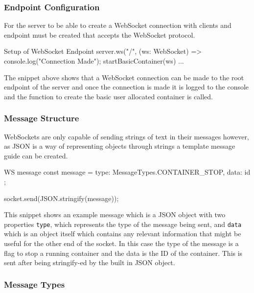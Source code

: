 \subsubsection{Endpoint Configuration} \label{impl-ws-config}

For the server to be able to create a WebSocket connection with clients and endpoint must be created that accepts the WebSocket protocol. 

\begin{sexylisting}{Setup of WebSocket Endpoint}
    server.ws("/", (ws: WebSocket) => {
        console.log("Connection Made");
        startBasicContainer(ws)
        {...}
    }
\end{sexylisting}

The snippet above shows that a WebSocket connection can be made to the root endpoint of the server and once the connection is made it is logged to the console and the function to create the basic user allocated container is called.

\subsubsection{Message Structure} \label{impl-ws-msg-struct}

WebSockets are only capable of sending strings of text in their messages however, as JSON is a way of representing objects through strings a template message guide can be created.

\begin{sexylisting}[label={code:ws-msg}]{WS message}
    const message = {
        type: MessageTypes.CONTAINER_STOP,
        data: { id }
    };

    socket.send(JSON.stringify(message));
\end{sexylisting}

This snippet shows an example message which is a JSON object with two properties \texttt{type}, which represents the type of the message being sent, and \texttt{data} which is an object itself which contains any relevant information that might be useful for the other end of the socket. In this case the type of the message is a flag to stop a running container and the data is the ID of the container. This is sent after being stringify-ed by the built in JSON object.

\subsubsection{Message Types} \label{impl-ws-msg-type}

